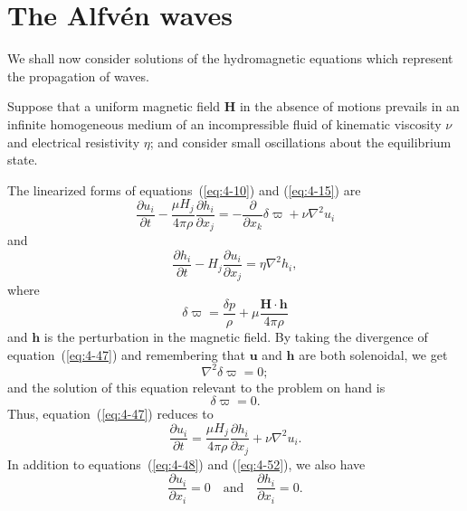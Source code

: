 \section{The Alfv\'en waves}\label{sec:39}

We shall now consider solutions of the hydromagnetic equations which represent the propagation of waves.

Suppose that a uniform magnetic field $\mathbf{H}$ in the absence of motions prevails in an infinite homogeneous medium of an incompressible fluid of kinematic viscosity $\nu$ and electrical resistivity $\eta$; and consider small oscillations about the equilibrium state.

The linearized forms of equations~(\ref{eq:4-10}) and (\ref{eq:4-15}) are
\begin{equation}
\label{eq:4-47}
\frac{\partial u_i}{\partial t} - \frac{\mu H_j}{4\pi\rho}\frac{\partial h_i}{\partial x_j} = -\frac{\partial}{\partial x_k}\delta\varpi + \nu\nabla^2 u_i
\end{equation}
and
\begin{equation}
\label{eq:4-48}
\frac{\partial h_i}{\partial t} - H_j\frac{\partial u_i}{\partial x_j} = \eta\nabla^2 h_i,
\end{equation}
where
\begin{equation}
\label{eq:4-49}
\delta\varpi = \frac{\delta p}{\rho}+\mu\frac{\mathbf{H}\cdot\mathbf{h}}{4\pi\rho}
\end{equation}
and $\mathbf{h}$ is the perturbation in the magnetic field. By taking the divergence of equation~(\ref{eq:4-47}) and remembering that $\mathbf{u}$ and $\mathbf{h}$ are both solenoidal, we get
\begin{equation}
\label{eq:4-50}
\nabla^2\delta\varpi = 0;
\end{equation}
and the solution of this equation relevant to the problem on hand is
\begin{equation}
\label{eq:4-51}
\delta\varpi = 0.
\end{equation}
Thus, equation~(\ref{eq:4-47}) reduces to
\begin{equation}
\label{eq:4-52}
\frac{\partial u_i}{\partial t} = \frac{\mu H_j}{4\pi\rho}\frac{\partial h_i}{\partial x_j}+\nu\nabla^2 u_i.
\end{equation}
In addition to equations~(\ref{eq:4-48}) and (\ref{eq:4-52}), we also have
\begin{equation}
\label{eq:4-53}
\frac{\partial u_i}{\partial x_i} = 0 \quad \text{and} \quad \frac{\partial h_i}{\partial x_i} = 0.
\end{equation}

